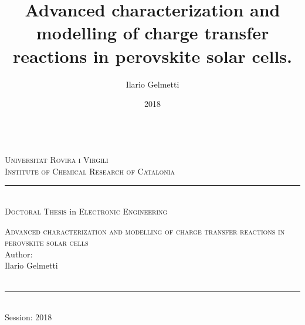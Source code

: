 \documentclass[b5paper, 12pt, openright]{book} %
\title{Advanced characterization and modelling of charge transfer reactions in perovskite solar cells.}
\author{Ilario Gelmetti}
\date{2018}
\begin{document}
\pagestyle{plain}

\frontmatter

{\let\cleardoublepage\clearpage %

\begin{titlepage}\begin{center}



	\\%
	\bigskip
	\large{\textsc{Universitat Rovira i Virgili\\ Institute of Chemical Research of Catalonia}}\\
		\rule{5cm}{1pt}\\
	{
\smallskip
	{\textsc{Doctoral Thesis} in \textsc{Electronic Engineering}}}\\
\vfill

	\huge{\textsc{Advanced characterization and modelling of charge transfer reactions in perovskite solar cells}}\\
\vfill
	\footnotesize{Author:}\\
	\large{Ilario Gelmetti}\\
		\makebox[.2\textwidth]{\rule{0pt}{.02\textheight}}\\
\end{center}
\begin{small}
\bigskip\bigskip\bigskip\bigskip
	\begin{center}
	\rule{3cm}{1pt}\\
	Session: 2018\\
	\end{center}
\end{small}
\end{titlepage}

}
\end{document}
